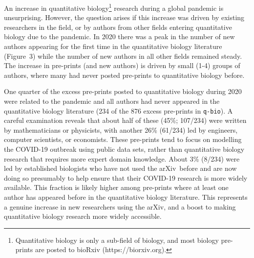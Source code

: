 \documentclass[a4paper,12pt]{article}
\newcommand{\arxiv}{arXiv}
\begin{document}
An increase in quantitative biology\footnote{Quantitative biology is only a sub-field of biology, and most biology pre-prints are posted to bioRxiv ({https://biorxiv.org}).} research during a global pandemic is unsurprising. However, the question arises if this increase was driven by existing researchers in the field, or by authors from other fields entering quantitative biology due to the pandemic. In 2020 there was a peak in the number of new authors appearing for the first time in the quantitative biology literature (Figure~3) while the number of new authors in all other fields remained steady. The increase in pre-prints (and new authors) is driven by small (1-4) groups of authors, where many had never posted pre-prints to quantitative biology before.


One quarter of the excess pre-prints posted to quantitative biology during 2020 were related to the pandemic and all authors had never appeared in the quantitative biology literature (234 of the 876 excess pre-prints in \texttt{q-bio}). A careful examination reveals that about half of these (45\%; 107/234) were written by mathematicians or physicists, with another 26\% (61/234) led by engineers, computer scientists, or economists. These pre-prints tend to focus on modelling the COVID-19 outbreak using public data sets, rather than quantitative biology research that requires more expert domain knowledge. About 3\% (8/234) were led by established biologists who have not used the \arxiv\ before and are now doing so presumably to help ensure that their COVID-19 research is more widely available. This fraction is likely higher among pre-prints where at least one author has appeared before in the quantitative biology literature. This represents a genuine increase in new researchers using the \arxiv, and a boost to making quantitative biology research more widely accessible. 





\end{document}

